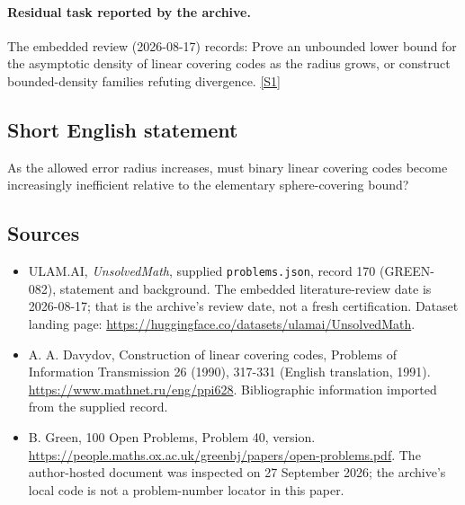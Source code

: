 \documentclass[11pt,a4paper]{article}
\newcommand{\sref}[2]{\hyperlink{source:#1:#2}{[S#2]}}
\begin{document}
\paragraph{Residual task reported by the archive.}

The embedded review (2026-08-17) records: Prove an unbounded lower bound for the asymptotic density of linear covering codes as the radius grows, or construct bounded-density families refuting divergence. \sref{170}{1}

\subsection{Short English statement}

As the allowed error radius increases, must binary linear covering codes become increasingly inefficient relative to the elementary sphere-covering bound?

\subsection{Sources}

{\small

\begin{itemize}

\item[\hypertarget{source:170:1}{S1}] ULAM.AI, \emph{UnsolvedMath}, supplied \texttt{problems.json}, record 170 (GREEN-082), statement and background. The embedded literature-review date is 2026-08-17; that is the archive’s review date, not a fresh certification. Dataset landing page: \url{https://huggingface.co/datasets/ulamai/UnsolvedMath}.

\item[\hypertarget{source:170:2}{S2}] A. A. Davydov, Construction of linear covering codes, Problems of Information Transmission 26 (1990), 317-331 (English translation, 1991). \url{https://www.mathnet.ru/eng/ppi628}. Bibliographic information imported from the supplied record.

\item[\hypertarget{source:170:3}{S3}] B. Green, 100 Open Problems, Problem 40, version. \url{https://people.maths.ox.ac.uk/greenbj/papers/open-problems.pdf}. The author-hosted document was inspected on 27 September 2026; the archive’s local code is not a problem-number locator in this paper.

\end{itemize}

}

\label{end:170}
\end{document}
